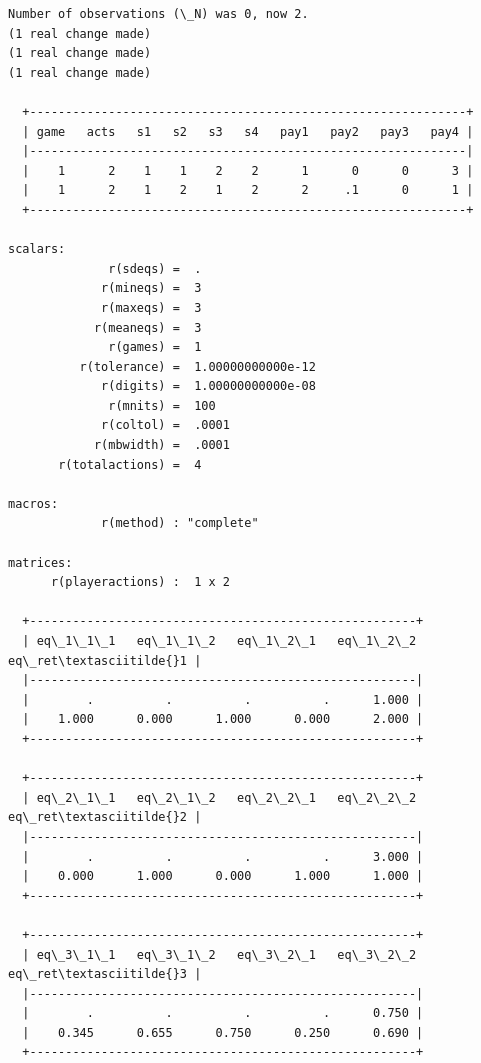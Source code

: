 \documentclass[11pt]{article}
\begin{document}
    \begin{Verbatim}[commandchars=\\\{\}]
Number of observations (\_N) was 0, now 2.
(1 real change made)
(1 real change made)
(1 real change made)

  +-------------------------------------------------------------+
  | game   acts   s1   s2   s3   s4   pay1   pay2   pay3   pay4 |
  |-------------------------------------------------------------|
  |    1      2    1    1    2    2      1      0      0      3 |
  |    1      2    1    2    1    2      2     .1      0      1 |
  +-------------------------------------------------------------+

scalars:
              r(sdeqs) =  .
             r(mineqs) =  3
             r(maxeqs) =  3
            r(meaneqs) =  3
              r(games) =  1
          r(tolerance) =  1.00000000000e-12
             r(digits) =  1.00000000000e-08
              r(mnits) =  100
             r(coltol) =  .0001
            r(mbwidth) =  .0001
       r(totalactions) =  4

macros:
             r(method) : "complete"

matrices:
      r(playeractions) :  1 x 2

  +------------------------------------------------------+
  | eq\_1\_1\_1   eq\_1\_1\_2   eq\_1\_2\_1   eq\_1\_2\_2   eq\_ret\textasciitilde{}1 |
  |------------------------------------------------------|
  |        .          .          .          .      1.000 |
  |    1.000      0.000      1.000      0.000      2.000 |
  +------------------------------------------------------+

  +------------------------------------------------------+
  | eq\_2\_1\_1   eq\_2\_1\_2   eq\_2\_2\_1   eq\_2\_2\_2   eq\_ret\textasciitilde{}2 |
  |------------------------------------------------------|
  |        .          .          .          .      3.000 |
  |    0.000      1.000      0.000      1.000      1.000 |
  +------------------------------------------------------+

  +------------------------------------------------------+
  | eq\_3\_1\_1   eq\_3\_1\_2   eq\_3\_2\_1   eq\_3\_2\_2   eq\_ret\textasciitilde{}3 |
  |------------------------------------------------------|
  |        .          .          .          .      0.750 |
  |    0.345      0.655      0.750      0.250      0.690 |
  +------------------------------------------------------+
    \end{Verbatim}
\end{document}
